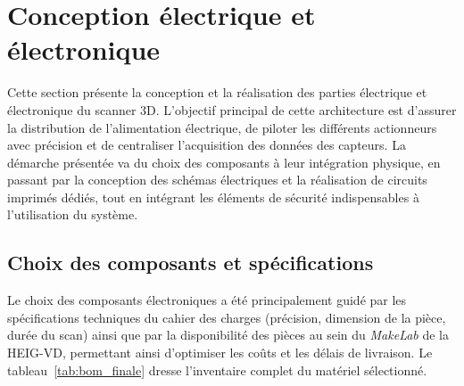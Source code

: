 \newpage
\section{Conception électrique et électronique}
\label{sec:conception_electronique}

Cette section présente la conception et la réalisation des parties électrique et électronique du scanner 3D. 
L'objectif principal de cette architecture est d'assurer la distribution de l'alimentation électrique, de piloter les différents actionneurs avec précision et de centraliser l'acquisition des données des capteurs.
La démarche présentée va du choix des composants à leur intégration physique, en passant par la conception des schémas électriques et la réalisation de circuits imprimés dédiés, tout en intégrant les éléments de sécurité indispensables à l'utilisation du système.


\subsection{Choix des composants et spécifications}
\label{subsec:composants}

Le choix des composants électroniques a été principalement guidé par les spécifications techniques du cahier des charges (précision, dimension de la pièce, durée du scan) ainsi que par la disponibilité des pièces au sein du \textit{MakeLab} de la HEIG-VD, permettant ainsi d'optimiser les coûts et les délais de livraison.
Le tableau~\ref{tab:bom_finale} dresse l'inventaire complet du matériel sélectionné.

